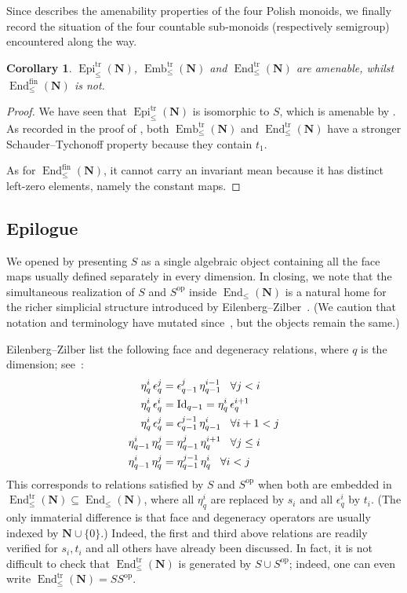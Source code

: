 \documentclass[12pt, pdflatex]{amsart}
\newtheorem{corollary}[theorem]{Corollary}
\theoremstyle{definition}
\numberwithin{equation}{section}
\numberwithin{theorem}{section}
\newcommand{\NN}{\mathbf{N}}
\DeclareMathOperator{\End}{End}
\DeclareMathOperator{\Emb}{Emb}
\DeclareMathOperator{\Epi}{Epi}
\begin{document}
Since  describes the amenability properties of the four Polish monoids, we finally record the situation of the four countable sub-monoids (respectively semigroup) encountered along the way.

\begin{corollary}
$\Epi_\leq^\mathrm{tr}(\NN)$, $\Emb_\leq^\mathrm{tr}(\NN)$ and $\End_\leq^\mathrm{tr}(\NN)$ are amenable, whilst $\End_\leq^\mathrm{fin}(\NN)$ is not.
\end{corollary}

\begin{proof}
We have seen that $\Epi_\leq^\mathrm{tr}(\NN)$ is isomorphic to $S$, which is amenable by . As recorded in the proof of , both $\Emb_\leq^\mathrm{tr}(\NN)$ and $\End_\leq^\mathrm{tr}(\NN)$ have a stronger Schauder--Tychonoff property because they contain $t_1$.

As for $\End_\leq^\mathrm{fin}(\NN)$, it cannot carry an invariant mean because it has distinct left-zero elements, namely the constant maps.
\end{proof}

\subsection*{Epilogue}
We opened by presenting $S$ as a single algebraic object containing all the face maps usually defined separately in every dimension. In closing, we note that the simultaneous realization of $S$ and $S^\mathrm{op}$ inside $\End_\leq(\NN)$ is a natural home for the richer simplicial structure introduced by Eilenberg--Zilber~\cite{Eilenberg-Zilber50}. (We caution that notation and terminology have mutated since~\cite{Eilenberg-Zilber50}, but the objects remain the same.)

Eilenberg--Zilber list the following face and degeneracy relations, where $q$ is the dimension; see~\cite[\S10]{Eilenberg-Zilber50}:
\begin{align*}
\eta_q^i \, \epsilon _q^j &= \epsilon_{q-1}^j \, \eta_{q-1}^{i-1} \kern3mm \forall j<i\\
\eta_q^i \, \epsilon _q^i &= \mathrm{Id}_{q-1} = \eta_q^i \, \epsilon _q^{i+1}\\
\eta_q^i \, \epsilon _q^j &= \epsilon_{q-1}^{j-1}  \, \eta_{q-1}^i \kern3mm \forall i+1<j\\
\eta_{q-1}^i \, \eta_q^j &= \eta_{q-1}^j \, \eta_q^{i+1}  \kern3mm \forall j\leq i\\
\eta_{q-1}^i \, \eta_q^j &= \eta_{q-1}^{j-1} \, \eta_q^i  \kern3mm \forall i <j
\end{align*}
This corresponds to  relations satisfied by $S$ and $S^\mathrm{op}$ when both are embedded in $\End_\leq^\mathrm{tr}(\NN) \subseteq \End_\leq(\NN)$, where all $\eta_q^i$ are replaced by $s_i$ and all $\epsilon _q^i$ by $t_i$. (The only immaterial difference is that face and degeneracy operators are usually indexed by $\NN\cup\{0\}$.) Indeed, the first and third above relations are readily verified for $s_i, t_i$ and all others have already been discussed. In fact, it is not difficult to check that $\End_\leq^\mathrm{tr}(\NN)$ is generated by $S \cup S^\mathrm{op}$; indeed, one can even write $\End_\leq^\mathrm{tr}(\NN) = S  S^\mathrm{op}$.
\end{document}
